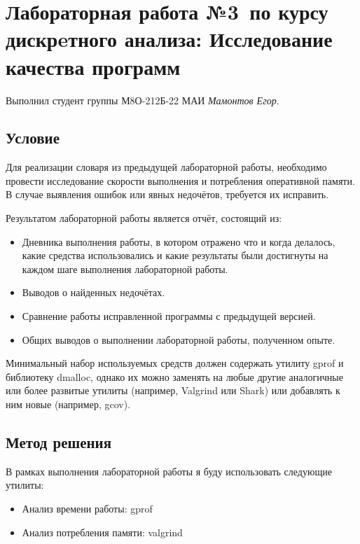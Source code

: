 \documentclass[12pt]{article}
\begin{document}
\section*{Лабораторная работа №3\, по курсу дискрeтного анализа: Исследование качества программ}

Выполнил студент группы М8О-212Б-22 МАИ \textit{Мамонтов Егор}.

\subsection*{Условие}


Для реализации словаря из предыдущей лабораторной работы, необходимо провести исследование скорости выполнения и потребления оперативной памяти.
В случае выявления ошибок или явных недочётов, требуется их исправить.

Результатом лабораторной работы является отчёт, состоящий из:

\begin{itemize}
    \item Дневника выполнения работы, в котором отражено что и когда делалось, какие средства использовались и какие результаты были достигнуты на каждом шаге выполнения
    лабораторной работы.
    \item Выводов о найденных недочётах.
    \item Сравнение работы исправленной программы с предыдущей версией.
    \item Общих выводов о выполнении лабораторной работы, полученном опыте.
\end{itemize}

Минимальный набор используемых средств должен содержать утилиту gprof и библиотеку dmalloc,
однако их можно заменять на любые другие аналогичные или более развитые утилиты (например, Valgrind или Shark)
или добавлять к ним новые (например, gcov).

\newpage
\subsection*{Метод решения}

В рамках выполнения лабораторной работы я буду использовать следующие утилиты:
\begin{itemize}
    \item Анализ времени работы: gprof
    \item Анализ потребления памяти: valgrind
\end{itemize}
\end{document}
